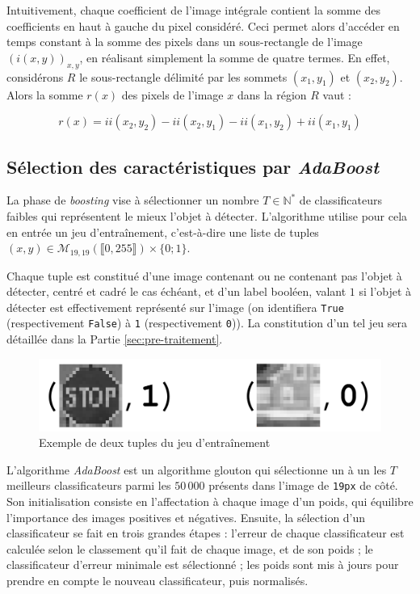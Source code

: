 \documentclass[12pt,a4paper]{article}
\begin{document}
Intuitivement, chaque coefficient de l'image intégrale contient la somme des coefficients en haut à gauche du pixel considéré. Ceci permet alors d'accéder en temps constant à la somme des pixels dans un sous-rectangle de l'image $(i(x, y))_{x, y}$, en réalisant simplement la somme de quatre termes. En effet, considérons $R$ le sous-rectangle délimité par les sommets $(x_1, y_1)$ et $(x_2, y_2)$. Alors la somme $r(x)$ des pixels de l'image $x$ dans la région $R$ vaut :

\begin{equation}\label{somme-region}
    \boxed{r(x) = ii(x_2, y_2) - ii(x_2, y_1) - ii(x_1, y_2) + ii(x_1, y_1)}
\end{equation}


\subsection{Sélection des caractéristiques par \textit{AdaBoost}}
La phase de \textit{boosting} vise à sélectionner un nombre $T \in \mathbb{N}^*$ de classificateurs faibles qui représentent le mieux l'objet à détecter. L'algorithme utilise pour cela en entrée un jeu d'entraînement, c'est-à-dire une liste de tuples $(x, y) \in \mathscr{M}_{19, 19}(\llbracket 0, 255 \rrbracket) \times \{0 ; 1\}$. 

Chaque tuple est constitué d'une image contenant ou ne contenant pas l'objet à détecter, centré et cadré le cas échéant, et d'un label booléen, valant $1$ si l'objet à détecter est effectivement représenté sur l'image (on identifiera \texttt{True} (respectivement \texttt{False}) à \texttt{1} (respectivement \texttt{0})). La constitution d'un tel jeu sera détaillée dans la Partie \ref{sec:pre-traitement}.

\begin{figure}[h]
    \includegraphics[scale = 0.4]{exemples-jeu-cut}
    \centering
    \caption{Exemple de deux tuples du jeu d'entraînement}
\end{figure}

L'algorithme \textit{AdaBoost} est un algorithme glouton qui sélectionne un à un les $T$ meilleurs classificateurs parmi les $50\,000$ présents dans l'image de \texttt{19px} de côté. Son initialisation consiste en l'affectation à chaque image d'un poids, qui équilibre l'importance des images positives et négatives. Ensuite, la sélection d'un classificateur se fait en trois grandes étapes : l'erreur de chaque classificateur est calculée selon le classement qu'il fait de chaque image, et de son poids ; le classificateur d'erreur minimale est sélectionné ; les poids sont mis à jours pour prendre en compte le nouveau classificateur, puis normalisés.
\end{document}
